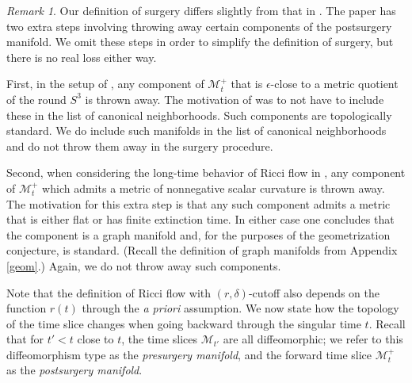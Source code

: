 \documentclass[12pt]{amsart}
\newcommand{\M}{{\mathcal M}}
\newcommand{\de}{\delta}
\numberwithin{equation}{section}
\theoremstyle{plain}
\theoremstyle{definition}
\theoremstyle{remark}
\newtheorem{remark}[equation]{Remark}
\begin{document}
\begin{remark}
Our definition of surgery differs slightly from that in
\cite{Perelman2}. The paper \cite{Perelman2} has two
extra steps involving throwing away certain components
of the postsurgery manifold.
We omit these steps in order to simplify the definition of
surgery, but there is no real loss either way.

First, in the setup of \cite[Section 4.4]{Perelman2},
any component of $\M_{t}^+$ that is $\epsilon$-close
to a metric quotient of the round $S^3$ is thrown away. The
motivation of \cite{Perelman2} was to not have to include 
these in the list of canonical neighborhoods. Such
components
are topologically standard.  We do include such manifolds
in the list of canonical neighborhoods and do not
throw them away in the surgery procedure. 

Second,
when considering the long-time behavior of Ricci flow
in \cite[Section 7]{Perelman2}, 
any component of $\M_{t}^+$ which admits a
metric of nonnegative scalar curvature is thrown away.
The motivation for this extra step is that any such
component admits a metric that is either flat or has
finite extinction time.  In either case one concludes that
the component is a graph manifold and, for the purposes
of the geometrization conjecture, is standard.
(Recall the definition of graph manifolds from
Appendix \ref{geom}.)
Again, we do not throw away such components.
\end{remark}


Note that the definition of Ricci flow with $(r, \de)$-cutoff also depends
on the function $r(t)$ through the {\it a priori} assumption. We now state
how the topology of the time slice changes when going backward through the 
singular time  $t$.  Recall that for $t'<t$ close to $t$, the time slices
$\M_{t'}$ are all diffeomorphic; we refer to this diffeomorphism type
as the {\em presurgery manifold}, and the forward time slice
$\M_t^+$ as the {\em postsurgery manifold}.
\end{document}
